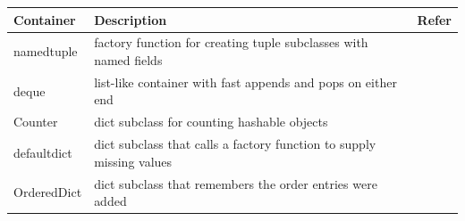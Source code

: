 \documentclass[../main.tex]{subfiles}
\begin{document}
\begin{table}[h]
\begin{small}
\centering
\noindent{}
 \noindent \begin{tabular}{|p{}|p{}| p{}| }
  \hline
Container& Description & Refer  \\ \hline
namedtuple  &  	factory function for creating tuple subclasses with named fields & \\\hline
deque  &list-like container with fast appends and pops on either end &\\ \hline
Counter  &dict subclass for counting hashable objects &\\ \hline
defaultdict  &dict subclass that calls a factory function to supply missing values & \\ \hline
OrderedDict  &dict subclass that remembers the order entries were added&\\ \hline
\end{tabular}
  \label{tab:collections_container}
  \end{small}
\end{table}
\end{document}
